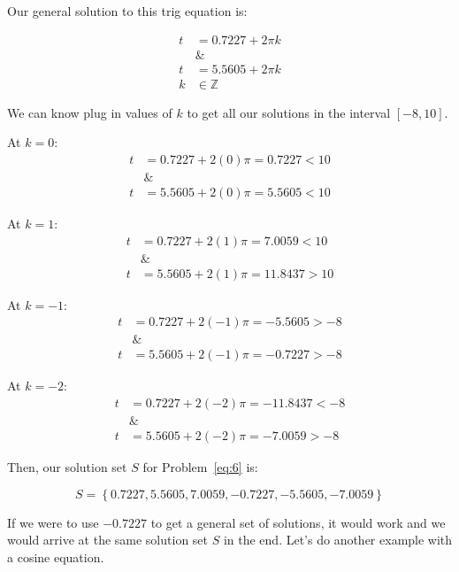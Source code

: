 \documentclass[12pt]{article}
\theoremstyle{definition}
\begin{document}
Our general solution to this trig equation is:

\begin{align}
    t & = 0.7227 + 2\pi k \\
      & \&                \\
    t & = 5.5605 + 2\pi k \\
    k & \in \mathbb{Z}
\end{align}

We can know plug in values of $k$ to get all our solutions in the interval $[-8, 10]$.

At $k=0$:
\begin{align}
    t & = 0.7227 + 2(0)\pi = 0.7227 < 10 \\
      & \&                               \\
    t & = 5.5605 + 2(0)\pi = 5.5605 < 10
\end{align}

At $k=1$:
\begin{align}
    t & = 0.7227 + 2(1)\pi = 7.0059 < 10  \\
      & \&                                \\
    t & = 5.5605 + 2(1)\pi = 11.8437 > 10
\end{align}

At $k=-1$:
\begin{align}
    t & = 0.7227 + 2(-1)\pi = -5.5605 > -8 \\
      & \&                                 \\
    t & = 5.5605 + 2(-1)\pi = -0.7227 > -8
\end{align}

At $k=-2$:
\begin{align}
    t & = 0.7227 + 2(-2)\pi = -11.8437 < -8 \\
      & \&                                  \\
    t & = 5.5605 + 2(-2)\pi = -7.0059 > -8
\end{align}

Then, our solution set $S$ for Problem~\eqref{eq:6} is:

\begin{equation}
    S = \left\{ 0.7227, 5.5605, 7.0059, -0.7227, -5.5605, -7.0059 \right\}
\end{equation}

If we were to use $-0.7227$ to get a general set of solutions, it would work and we would arrive at the same solution set $S$ in the end.
Let's do another example with a cosine equation.
\end{document}
